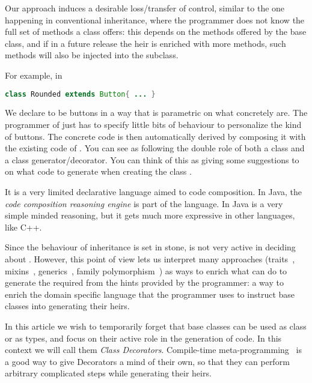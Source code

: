 Our approach
induces a desirable loss/transfer of control,
similar to the one happening in conventional inheritance, where
the programmer does not know the full set of methods a class offers:
this depends on the methods offered by the base class,
and if in a future release the heir is enriched with
more methods, such methods will also be injected into
the subclass.

\noindent
For example, in

\begin{lstlisting}[language=Java]
class Rounded extends Button{ ... }
\end{lstlisting}

We declare \Q@Rounded@s to be buttons in a way that
is parametric on what \Q@Button@s concretely are.
The programmer of \Q@Rounded@ just has to specify little bits
of behaviour to personalize the kind of buttons.
The concrete code is then automatically derived
by composing it with the existing code of \Q@Button@.
You can see \Q@Button@s as
following the double role of both a class and a class generator/decorator.
You can think of this as giving some suggestions to \Q@Button@
on what code to generate when creating the class \Q@Rounded@.

It is a very limited declarative language aimed to code composition.
In Java,  the \emph{code composition reasoning engine} is part of the language.
In Java is a very simple minded reasoning, but it gets much more expressive in other languages, like C++.

Since the behaviour of inheritance
is set in stone, \Q@Button@ is not very active in deciding
about \Q@Rounded@.
However, this point of view lets us interpret many approaches
(traits~\cite{scharli2003traits}, mixins~\cite{smaragdakis2000mixin}, generics~\cite{igarashi2001featherweight}, family polymorphism~\cite{ernst2001family})
as ways to enrich what \Q@Button@ can do to generate the
required \Q@Rounded@ from the hints provided by the programmer:
a way to enrich the domain specific language
that the programmer uses to instruct base classes into generating their heirs.

In this article we wish to temporarily forget that base classes can be used as class or as types, and
focus on their active role in the generation
of code. In this context we will call them \emph{Class Decorators}.
Compile-time meta-programming~\cite{sheard2002template} is a good way to give Decorators
a mind of their own, so that they can perform arbitrary
complicated steps while generating their heirs.



